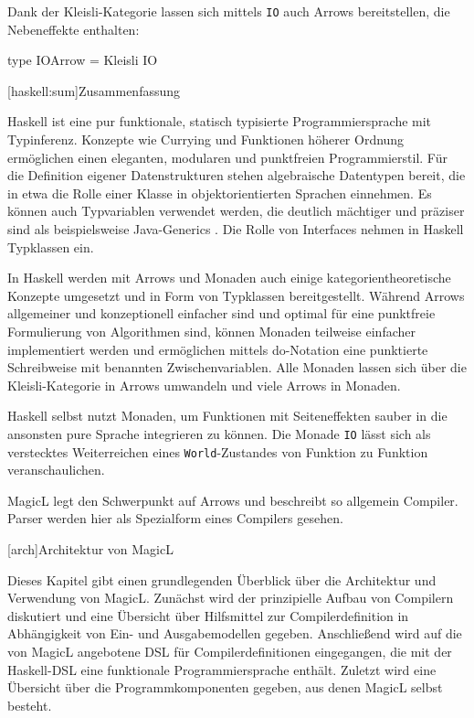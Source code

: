 \documentclass[12pt, a4paper, bibgerm]{scrbook}
\newenvironment{DIFnomarkup}{}{}
\newcommand\icode[1]{\lstinline?#1?}
\newcommand\lchapter{}
\newcommand\lsection{}
\begin{document}
Dank der Kleisli-Kategorie lassen sich mittels \icode{IO} auch Arrows
bereitstellen, die Nebeneffekte enthalten:
\begin{DIFnomarkup}\begin{code}
type IOArrow = Kleisli IO
\end{code}\end{DIFnomarkup}

\lsection[haskell:sum]{Zusammenfassung}

Haskell ist eine pur funktionale, statisch typisierte Programmiersprache
mit Typinferenz. Konzepte wie Currying und Funktionen höherer Ordnung
ermöglichen einen eleganten, modularen und punktfreien
Programmierstil. Für die Definition eigener Datenstrukturen stehen
algebraische Datentypen bereit, die in etwa die Rolle einer Klasse in
objektorientierten Sprachen einnehmen. Es können auch Typvariablen
verwendet werden, die deutlich mächtiger und präziser sind als
beispielsweise Java-Generics \cite{JavaGenerics}. Die Rolle von
Interfaces nehmen in Haskell Typklassen ein.

In Haskell werden mit Arrows und Monaden auch einige
kategorientheoretische Konzepte umgesetzt und in Form von Typklassen
bereitgestellt. Während Arrows allgemeiner und konzeptionell einfacher
sind und optimal für eine punktfreie Formulierung von Algorithmen sind,
können Monaden teilweise einfacher implementiert werden und ermöglichen
mittels do-Notation eine punktierte Schreibweise mit benannten
Zwischenvariablen. Alle Monaden lassen sich über die Kleisli-Kategorie
in Arrows umwandeln und viele Arrows in Monaden.

Haskell selbst nutzt Monaden, um Funktionen mit Seiteneffekten sauber in
die ansonsten pure Sprache integrieren zu können. Die Monade \icode{IO}
lässt sich als verstecktes Weiterreichen eines \icode{World}-Zustandes von
Funktion zu Funktion veranschaulichen.

MagicL legt den Schwerpunkt auf Arrows und beschreibt so allgemein
Compiler. Parser werden hier als Spezialform eines Compilers gesehen.

\lchapter[arch]{Architektur von MagicL}

Dieses Kapitel gibt einen grundlegenden Überblick über die Architektur
und Verwendung von MagicL. Zunächst wird der prinzipielle Aufbau von
Compilern diskutiert und eine Übersicht über Hilfsmittel zur
Compilerdefinition in Abhängigkeit von Ein- und Ausgabemodellen
gegeben. Anschließend wird auf die von MagicL angebotene DSL für
Compilerdefinitionen eingegangen, die mit der Haskell-DSL eine
funktionale Programmiersprache enthält. Zuletzt wird eine Übersicht über
die Programmkomponenten gegeben, aus denen MagicL selbst besteht.
\end{document}
